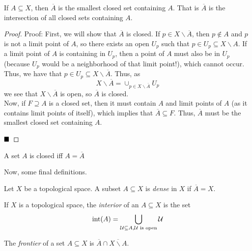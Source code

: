 \begin{lemma}
    If $A \subseteq X$, then $\overline{A}$ is the smallest closed set containing $A$. That is $\overline{A}$ is the intersection of all closed sets containing $A$.
\end{lemma}
\begin{proof}{Proof:}
    First, we will show that $\overline{A}$ is closed. If $p \in X \backslash \overline{A}$, then $p \notin A$ and $p$ is not a limit point of $A$, so there exists an open $U_{p}$ such that $p \in U_{p} \subseteq X \backslash A$. If a limit point of $A$ is containing in $U_{p}$, then a point of $A$ must also be in $U_{p}$ (because $U_{p}$ would be a neighborhood of that limit point!), which cannot occur. Thus, we have that $p \in U_{p} \subseteq X \backslash \overline{A}$. Thus, as
    \[ X \backslash \overline{A} = \cup_{p \in X \backslash \overline{A}} U_{p} \]
    we see that $X \backslash \overline{A}$ is open, so $\overline{A}$ is closed.\\

    Now, if $F \supseteq A$ is a closed set, then it must contain $A$ and limit points of $A$ (as it contains limit points of itself), which implies that $\overline{A} \subseteq F$. Thus, $\overline{A}$ must be the smallest closed set containing $A$.

    $\qed$
\end{proof}
\begin{lemma}
    A set $A$ is closed iff $A = \overline{A}$
\end{lemma}

Now, some final definitions.

\begin{definition}
    Let $X$ be a topological space. A subset $A \subseteq X$ is \emph{dense} in $X$ if $\overline{A} = X$. 
\end{definition}

\begin{definition}
    If $X$ is a topological space, the \emph{interior} of an $A \subseteq X$ is the set
    \[ \text{int}(A) = \bigcup_{\cal{U} \subseteq A, \cal{U} \text{ is open}} \cal{U} \]
\end{definition}

\begin{definition}
    The \emph{frontier} of a set $A \subseteq X$ is $\overline{A} \cap \overline{X \backslash A}$. 
\end{definition}
\clearpage